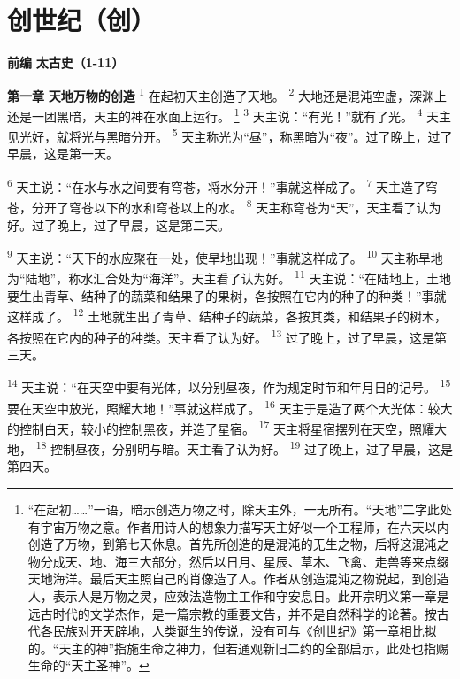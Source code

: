 \chapter{创世纪（创）}

\begin{center}
	\textbf{前编 }
	\textbf{太古史（1-11）}
\end{center}

\textbf{第一章 }
\textbf{天地万物的创造 }
\textsuperscript{1}
在起初天主创造了天地。
\textsuperscript{2}  
大地还是混沌空虚，深渊上还是一团黑暗，天主的神在水面上运行。
\renewcommand\thefootnote{\ding{\numexpr171+\value{footnote}}}
\footnote{“在起初……”一语，暗示创造万物之时，除天主外，一无所有。“天地”二字此处有宇宙万物之意。作者用诗人的想象力描写天主好似一个工程师，在六天以内创造了万物，到第七天休息。首先所创造的是混沌的无生之物，后将这混沌之物分成天、地、海三大部分，然后以日月、星辰、草木、飞禽、走兽等来点缀天地海洋。最后天主照自己的肖像造了人。作者从创造混沌之物说起，到创造人，表示人是万物之灵，应效法造物主工作和守安息日。此开宗明义第一章是远古时代的文学杰作，是一篇宗教的重要文告，并不是自然科学的论著。按古代各民族对开天辟地，人类诞生的传说，没有可与《创世纪》第一章相比拟的。“天主的神”指施生命之神力，但若通观新旧二约的全部启示，此处也指赐生命的“天主圣神”。}
\textsuperscript{3}
天主说：“有光！”就有了光。
\textsuperscript{4}
天主见光好，就将光与黑暗分开。
\textsuperscript{5}
天主称光为“昼”，称黑暗为“夜”。过了晚上，过了早晨，这是第一天。

\textsuperscript{6}
天主说：“在水与水之间要有穹苍，将水分开！”事就这样成了。
\textsuperscript{7}
天主造了穹苍，分开了穹苍以下的水和穹苍以上的水。
\textsuperscript{8}
天主称穹苍为“天”，天主看了认为好。过了晚上，过了早晨，这是第二天。

\textsuperscript{9}
天主说：“天下的水应聚在一处，使旱地出现！”事就这样成了。
\textsuperscript{10}
天主称旱地为“陆地”，称水汇合处为“海洋”。天主看了认为好。
\textsuperscript{11}
天主说：“在陆地上，土地要生出青草、结种子的蔬菜和结果子的果树，各按照在它内的种子的种类！”事就这样成了。
\textsuperscript{12}
土地就生出了青草、结种子的蔬菜，各按其类，和结果子的树木，各按照在它内的种子的种类。天主看了认为好。
\textsuperscript{13}
过了晚上，过了早晨，这是第三天。

\textsuperscript{14}
天主说：“在天空中要有光体，以分别昼夜，作为规定时节和年月日的记号。
\textsuperscript{15}
要在天空中放光，照耀大地！”事就这样成了。
\textsuperscript{16}
天主于是造了两个大光体：较大的控制白天，较小的控制黑夜，并造了星宿。
\textsuperscript{17}
天主将星宿摆列在天空，照耀大地，
\textsuperscript{18}
控制昼夜，分别明与暗。天主看了认为好。
\textsuperscript{19}
过了晚上，过了早晨，这是第四天。

